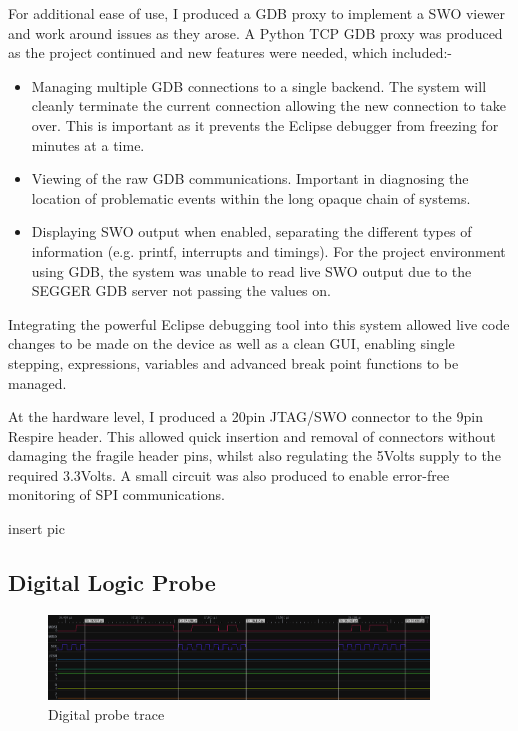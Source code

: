 For additional ease of use, I produced a \ac{GDB} proxy to implement a \ac{SWO} viewer and work around
issues as they arose. A Python TCP \ac{GDB} proxy was produced as the project continued and new
features were needed, which included:-
\begin{itemize}
  \item Managing multiple \ac{GDB} connections to a single backend. The system will cleanly terminate
        the current connection allowing the new connection to take over. This is important as it
        prevents the Eclipse debugger from freezing for minutes at a time.
  \item Viewing of the raw \ac{GDB} communications. Important in diagnosing the location of
        problematic events within the long opaque chain of systems.
  \item Displaying \ac{SWO} output when enabled, separating the different types of information (e.g.
        printf, interrupts and timings). For the project environment using GDB, the system was
        unable to read live \ac{SWO} output due to the SEGGER \ac{GDB} server not passing the values on.
\end{itemize}


Integrating the powerful Eclipse debugging tool into this system allowed live code changes to be
made on the device as well as a clean \ac{GUI}, enabling single stepping, expressions, variables and
advanced break point functions to be managed.


At the hardware level, I produced a 20pin \ac{JTAG}/\ac{SWO} connector to the 9pin Respire header. This
allowed quick insertion and removal of connectors without damaging the fragile header pins, whilst
also regulating the 5Volts supply to the required 3.3Volts. A small circuit was also produced to
enable error-free monitoring of \ac{SPI} communications.

{insert pic}


\subsection{Digital Logic Probe}

\begin{figure}
  \vspace{-10pt}
  \begin{center}
    \includegraphics[width=0.9\textwidth, keepaspectratio=true]{images/digital_probe.png}
  \end{center}
  \caption[Digital Probe Trace]{Digital probe trace}
  \label{digital_probe_example}
  \vspace{-10pt}
\end{figure}

